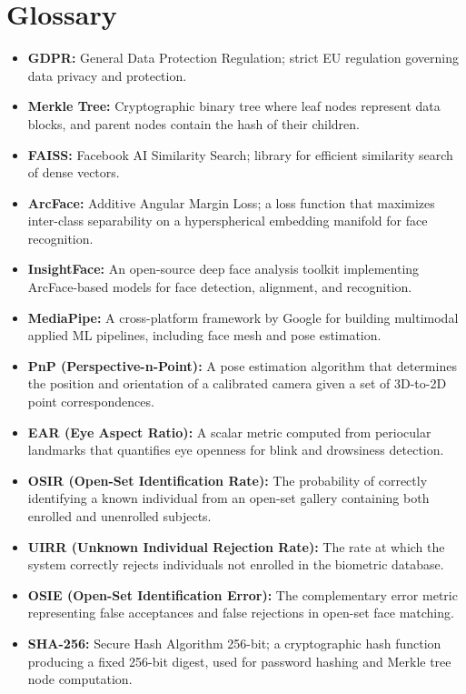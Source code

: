 \documentclass[12pt,a4paper,oneside]{report}
\begin{document}
\section{Glossary}
\begin{itemize}
    \item \textbf{GDPR:} General Data Protection Regulation; strict EU regulation governing data privacy and protection.
    \item \textbf{Merkle Tree:} Cryptographic binary tree where leaf nodes represent data blocks, and parent nodes contain the hash of their children.
    \item \textbf{FAISS:} Facebook AI Similarity Search; library for efficient similarity search of dense vectors.
    \item \textbf{ArcFace:} Additive Angular Margin Loss; a loss function that maximizes inter-class separability on a hyperspherical embedding manifold for face recognition.
    \item \textbf{InsightFace:} An open-source deep face analysis toolkit implementing ArcFace-based models for face detection, alignment, and recognition.
    \item \textbf{MediaPipe:} A cross-platform framework by Google for building multimodal applied ML pipelines, including face mesh and pose estimation.
    \item \textbf{PnP (Perspective-n-Point):} A pose estimation algorithm that determines the position and orientation of a calibrated camera given a set of 3D-to-2D point correspondences.
    \item \textbf{EAR (Eye Aspect Ratio):} A scalar metric computed from periocular landmarks that quantifies eye openness for blink and drowsiness detection.
    \item \textbf{OSIR (Open-Set Identification Rate):} The probability of correctly identifying a known individual from an open-set gallery containing both enrolled and unenrolled subjects.
    \item \textbf{UIRR (Unknown Individual Rejection Rate):} The rate at which the system correctly rejects individuals not enrolled in the biometric database.
    \item \textbf{OSIE (Open-Set Identification Error):} The complementary error metric representing false acceptances and false rejections in open-set face matching.
    \item \textbf{SHA-256:} Secure Hash Algorithm 256-bit; a cryptographic hash function producing a fixed 256-bit digest, used for password hashing and Merkle tree node computation.

\end{itemize}
\end{document}
